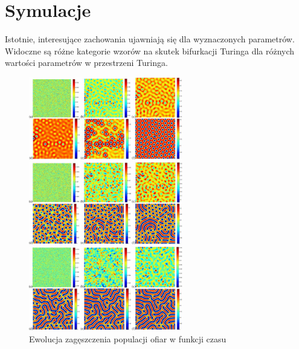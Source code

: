 \clearpage

\section{Symulacje}
\noindent Istotnie, interesujące zachowania ujawniają się dla wyznaczonych parametrów. Widoczne są różne kategorie wzorów na skutek bifurkacji Turinga dla różnych wartości parametrów w przestrzeni Turinga.


\begin{figure}[ht]
	\centering
	\includegraphics[width=0.6\textwidth]{img/3}
	
	\vspace*{\floatsep}%
	
	\includegraphics[width=0.6\textwidth]{img/2}
	
	\vspace*{\floatsep}%
	
	\includegraphics[width=0.6\textwidth]{img/1}
	
	\caption{Ewolucja zagęszczenia populacji ofiar w funkcji czasu}
\end{figure}

